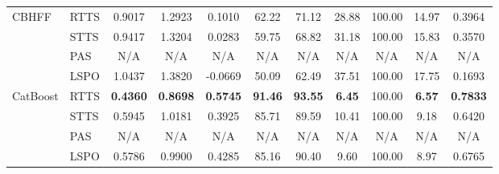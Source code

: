 \documentclass{article}
\begin{document}
{\begin{longtable}{llccccccccc}
\addlinespace

CBHFF
& RTTS
& 0.9017 & 1.2923 & 0.1010
& 62.22 & 71.12 & 28.88 & 100.00 & 14.97 & 0.3964 \\

& STTS
& 0.9417 & 1.3204 & 0.0283
& 59.75 & 68.82 & 31.18 & 100.00 & 15.83 & 0.3570 \\

& PAS
& N/A & N/A & N/A & N/A
& N/A & N/A & N/A & N/A & N/A \\

& LSPO
& 1.0437 & 1.3820 & -0.0669
& 50.09 & 62.49 & 37.51 & 100.00 & 17.75 & 0.1693 \\

\addlinespace

CatBoost
& RTTS
& \textbf{0.4360} & \textbf{0.8698} & \textbf{0.5745}
& \textbf{91.46} & \textbf{93.55} & \textbf{6.45} & 100.00 & \textbf{6.57} & \textbf{0.7833} \\

& STTS
& 0.5945 & 1.0181 & 0.3925
& 85.71 & 89.59 & 10.41 & 100.00 & 9.18 & 0.6420 \\

& PAS
& N/A & N/A & N/A & N/A
& N/A & N/A & N/A & N/A & N/A \\

& LSPO
& 0.5786 & 0.9900 & 0.4285
& 85.16 & 90.40 & 9.60 & 100.00 & 8.97 & 0.6765 \\

\end{longtable}
}
\end{document}
